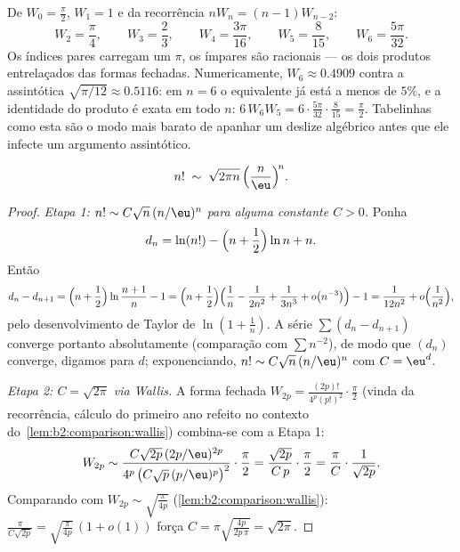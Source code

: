 \begin{example}\label{ex:b2:comparison:wallisvalues}
De $W_0 = \frac\pi2$, $W_1 = 1$ e da recorrência $nW_n =
(n-1)W_{n-2}$:
\[
W_2 = \frac\pi4, \qquad
W_3 = \frac23, \qquad
W_4 = \frac{3\pi}{16}, \qquad
W_5 = \frac{8}{15}, \qquad
W_6 = \frac{5\pi}{32}.
\]
Os índices pares carregam um $\pi$, os ímpares são racionais --- os dois
produtos entrelaçados das formas fechadas. Numericamente, $W_6
\approx 0.4909$ contra a assintótica
$\sqrt{\pi/12} \approx 0.5116$: em $n = 6$ o equivalente já está
a menos de $5\%$, e a identidade do produto é exata em todo
$n$: $6\,W_6W_5 = 6\cdot\frac{5\pi}{32}\cdot\frac8{15} =
\frac\pi2$. Tabelinhas como esta são o modo mais barato de
apanhar um deslize algébrico antes que ele infecte um argumento assintótico.
\end{example}

\begin{theorem}[Stirling]\label{thm:b2:comparison:stirling}
\[
n! \;\sim\; \sqrt{2\pi n}\, \Bigl(\frac{n}{\eu}\Bigr)^{\!n}
.\index{fórmula de Stirling}
\]
\end{theorem}

\begin{proof}
\emph{Etapa 1: $n! \sim C \sqrt n\, (n/\eu)^n$ para alguma constante $C >
0$.} Ponha
\[
d_n = \ln(n!) - \Bigl(n + \frac12\Bigr)\ln n + n .
\]
Então
\[
d_n - d_{n+1}
= \Bigl(n + \frac12\Bigr) \ln\frac{n+1}{n} - 1
= \Bigl(n + \frac12\Bigr)\Bigl(\frac1n - \frac{1}{2n^2} +
\frac{1}{3n^3} + o\bigl(n^{-3}\bigr)\Bigr) - 1
= \frac{1}{12n^2} + o\Bigl(\frac{1}{n^2}\Bigr),
\]
pelo desenvolvimento de Taylor de $\ln(1 + \frac1n)$. A série $\sum (d_n
- d_{n+1})$ converge portanto absolutamente (comparação com $\sum
n^{-2}$), de modo que $(d_n)$ converge, digamos para $d$; exponenciando, $n! \sim
C\sqrt n\,(n/\eu)^n$ com $C = \eu^{d}$.

\emph{Etapa 2: $C = \sqrt{2\pi}$ via Wallis.} A forma fechada $W_{2p}
= \frac{(2p)!}{4^p (p!)^2}\cdot\frac\pi2$ (vinda da recorrência,
cálculo do primeiro ano refeito no contexto do~\cref{lem:b2:comparison:wallis})
combina-se com a Etapa 1:
\[
W_{2p} \sim \frac{C\sqrt{2p}\,(2p/\eu)^{2p}}
{4^p\,\bigl(C\sqrt p\,(p/\eu)^p\bigr)^2}\cdot\frac{\pi}{2}
= \frac{\sqrt{2p}}{C\,p}\cdot\frac{\pi}{2}
= \frac{\pi}{C}\cdot\frac{1}{\sqrt{2p}} .
\]
Comparando com $W_{2p} \sim \sqrt{\frac{\pi}{4p}}$
(\cref{lem:b2:comparison:wallis}): $\frac{\pi}{C\sqrt{2p}} =
\sqrt{\frac{\pi}{4p}}\,(1 + o(1))$ força $C = \pi
\sqrt{\frac{4p}{2p\,\pi}} = \sqrt{2\pi}$.
\end{proof}

